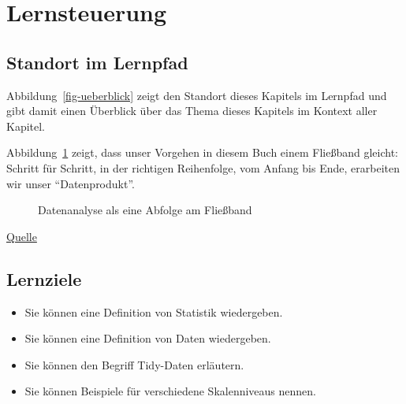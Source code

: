 \documentclass[
  a4paper,
  DIV=11]{scrreprt}
\providecommand{\tightlist}{%
  \setlength{\itemsep}{0pt}\setlength{\parskip}{0pt}}\usepackage{longtable,booktabs,array}
\theoremstyle{definition}
\theoremstyle{definition}
\theoremstyle{definition}
\theoremstyle{remark}
\begin{document}
\section{Lernsteuerung}\label{lernsteuerung}

\subsection{Standort im Lernpfad}\label{standort-im-lernpfad}

Abbildung~\ref{fig-ueberblick} zeigt den Standort dieses Kapitels im
Lernpfad und gibt damit einen Überblick über das Thema dieses Kapitels
im Kontext aller Kapitel.

Abbildung~\ref{fig-tidy5} zeigt, dass unser Vorgehen in diesem Buch
einem Fließband gleicht: Schritt für Schritt, in der richtigen
Reihenfolge, vom Anfang bis Ende, erarbeiten wir unser ``Datenprodukt''.

\begin{figure}


\caption{\label{fig-tidy5}Datenanalyse als eine Abfolge am Fließband}

\end{figure}%

\href{https://github.com/allisonhorst/stats-illustrations}{Quelle}

\subsection{Lernziele}\label{lernziele-1}

\begin{itemize}
\tightlist
\item
  Sie können eine Definition von Statistik wiedergeben.
\item
  Sie können eine Definition von Daten wiedergeben.
\item
  Sie können den Begriff Tidy-Daten erläutern.
\item
  Sie können Beispiele für verschiedene Skalenniveaus nennen.
\end{itemize}
\end{document}
